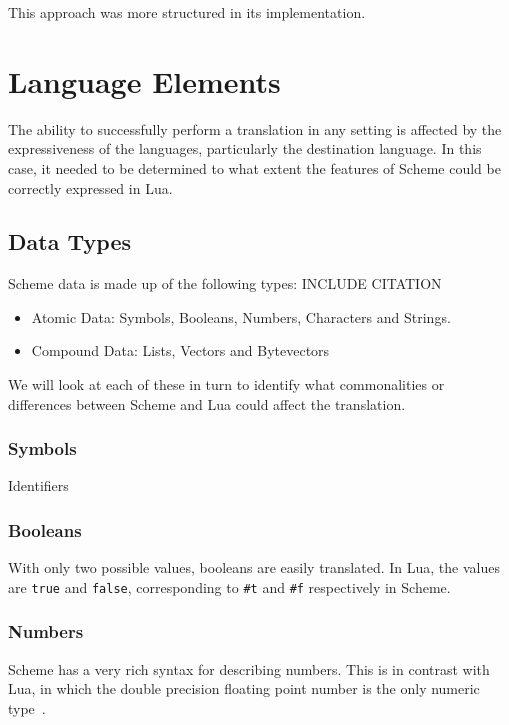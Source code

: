 This approach was more structured in its implementation.


\section{Language Elements}

The ability to successfully perform a translation in any setting is affected by
the expressiveness of the languages, particularly the destination language. In
this case, it needed to be determined to what extent the features of Scheme
could be correctly expressed in Lua.

\subsection{Data Types}

Scheme data is made up of the following types: INCLUDE CITATION
\begin{itemize}
\item Atomic Data: Symbols, Booleans, Numbers, Characters and Strings.
\item Compound Data: Lists, Vectors and Bytevectors
\end{itemize}

We will look at each of these in turn to identify what commonalities or
differences between Scheme and Lua could affect the translation.

\subsubsection{Symbols}

Identifiers

\subsubsection{Booleans}

With only two possible values, booleans are
easily translated. In Lua, the values are \texttt{true} and \texttt{false},
corresponding to \texttt{\#t} and \texttt{\#f} respectively in Scheme.

\subsubsection{Numbers}

Scheme has a very rich syntax for describing numbers. This is in contrast with
Lua, in which the double precision floating point number is the only
numeric type~\cite[p.10]{luabook}.

